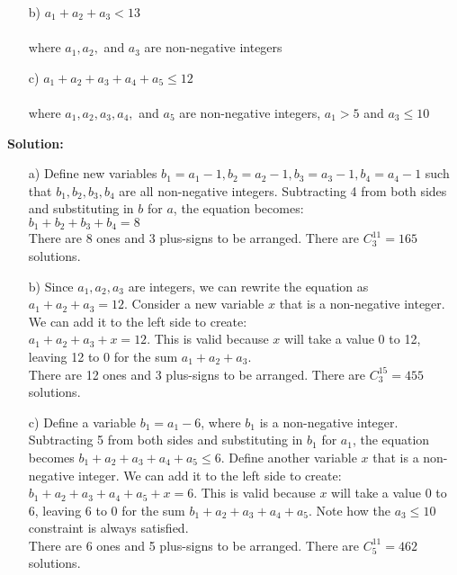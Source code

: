 \documentclass{article}
\newenvironment{solution}
{
\par
\color{blue}
\textbf{Solution:}
}
{
\par
}
\begin{document}
\begin{enumerate}
\begin{enumerate}
    \item[b)] $a_1 + a_2 + a_3 < 13$\\\\
    where $a_1, a_2,$ and $a_3$ are non-negative integers\\

    \item[c)] $a_1 + a_2 + a_3 + a_4 + a_5 \leq 12$\\\\
    where $a_1, a_2, a_3, a_4,$ and $a_5$ are non-negative integers, $a_1 > 5$ and $a_3 \leq 10$\\
    
\end{enumerate}
\begin{solution}
\begin{enumerate}
    \item[a)] Define new variables $b_1 = a_1 - 1, b_2 = a_2 - 1, b_3 = a_3 - 1, b_4 = a_4 - 1$ such that $b_1, b_2, b_3, b_4$ are all non-negative integers. Subtracting 4 from both sides and substituting in $b$ for $a$, the equation becomes:\\
    $b_1 + b_2 + b_3 + b_4 = 8$\\
    There are 8 ones and 3 plus-signs to be arranged. There are $C^{11}_3 = 165$ solutions.
    \item[b)] Since $a_1, a_2, a_3$ are integers, we can rewrite the equation as $a_1+ a_2 + a_3 = 12$. Consider a new variable $x$ that is a non-negative integer. We can add it to the left side to create:\\
    $a_1 + a_2 + a_3 + x = 12$. This is valid because $x$ will take a value 0 to 12, leaving 12 to 0 for the sum $a_1 + a_2 + a_3$.\\
    There are 12 ones and 3 plus-signs to be arranged. There are $C^{15}_3 = 455$ solutions.
    \item[c)] Define a variable $b_1 = a_1 - 6$, where $b_1$ is a non-negative integer. Subtracting 5 from both sides and substituting in $b_1$ for $a_1$, the equation becomes $b_1 + a_2 + a_3 + a_4 + a_5 \leq 6$. Define another variable $x$ that is a non-negative integer. We can add it to the left side to create:\\
    $b_1 + a_2 + a_3 + a_4 + a_5 + x = 6$. This is valid because $x$ will take a value 0 to 6, leaving 6 to 0 for the sum $b_1 + a_2 + a_3 + a_4 + a_5$. Note how the $a_3 \leq 10$ constraint is always satisfied.\\
    There are 6 ones and 5 plus-signs to be arranged. There are $C^{11}_5 = 462$ solutions.
\end{enumerate}
\end{solution}


\end{enumerate}
\end{document}
